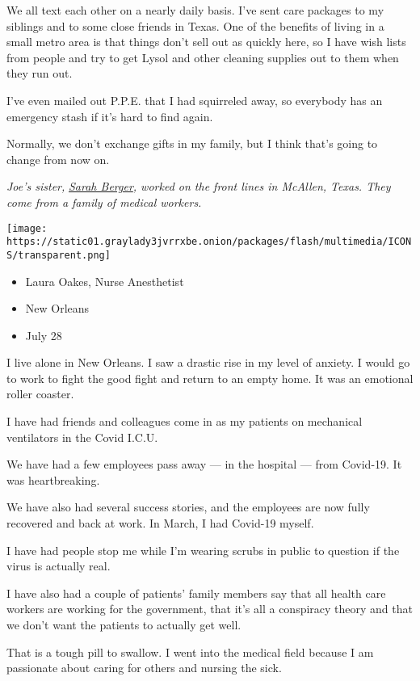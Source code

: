 We all text each other on a nearly daily basis. I've sent care packages
to my siblings and to some close friends in Texas. One of the benefits
of living in a small metro area is that things don't sell out as quickly
here, so I have wish lists from people and try to get Lysol and other
cleaning supplies out to them when they run out.

I've even mailed out P.P.E. that I had squirreled away, so everybody has
an emergency stash if it's hard to find again.

Normally, we don't exchange gifts in my family, but I think that's going
to change from now on.

\emph{Joe's sister,}
\emph{\href{https://www.nytimes3xbfgragh.onion/interactive/2020/world/coronavirus-health-care-workers.html\#item-sarah-berger}{Sarah
Berger}, worked on the front lines in McAllen, Texas. They come from a
family of medical workers.}

\texttt{[image: https://static01.graylady3jvrrxbe.onion/packages/flash/multimedia/ICONS/transparent.png]}

\begin{itemize}
\tightlist
\item
  Laura Oakes, Nurse Anesthetist
\item
  New Orleans
\item
  July 28
\end{itemize}

I live alone in New Orleans. I saw a drastic rise in my level of
anxiety. I would go to work to fight the good fight and return to an
empty home. It was an emotional roller coaster.

I have had friends and colleagues come in as my patients on mechanical
ventilators in the Covid I.C.U.

We have had a few employees pass away --- in the hospital --- from
Covid-19. It was heartbreaking.

We have also had several success stories, and the employees are now
fully recovered and back at work. In March, I had Covid-19 myself.

I have had people stop me while I'm wearing scrubs in public to question
if the virus is actually real.

I have also had a couple of patients' family members say that all health
care workers are working for the government, that it's all a conspiracy
theory and that we don't want the patients to actually get well.

That is a tough pill to swallow. I went into the medical field because I
am passionate about caring for others and nursing the sick.

